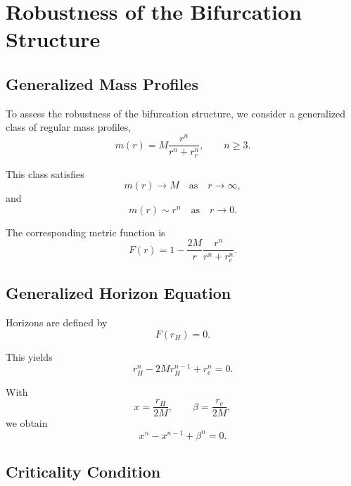 \documentclass[11pt,a4paper]{article}
\begin{document}
\appendix

\section{Robustness of the Bifurcation Structure}

\subsection{Generalized Mass Profiles}

To assess the robustness of the bifurcation structure, we consider a generalized class of regular mass profiles,
\begin{equation}
m(r) =
M
\frac{r^n}{r^n+r_c^n},
\qquad
n \geq 3 .
\end{equation}

This class satisfies
\begin{equation}
m(r) \to M
\quad
\text{as}
\quad
r \to \infty ,
\end{equation}
and
\begin{equation}
m(r) \sim r^n
\quad
\text{as}
\quad
r \to 0 .
\end{equation}

The corresponding metric function is
\begin{equation}
F(r)
=
1 -
\frac{2M}{r}
\frac{r^n}{r^n+r_c^n}.
\end{equation}

\subsection{Generalized Horizon Equation}

Horizons are defined by
\begin{equation}
F(r_H)=0 .
\end{equation}

This yields
\begin{equation}
r_H^n
-
2M r_H^{n-1}
+
r_c^n
=
0 .
\end{equation}

With
\begin{equation}
x = \frac{r_H}{2M},
\qquad
\beta = \frac{r_c}{2M},
\end{equation}
we obtain
\begin{equation}
x^n - x^{n-1} + \beta^n = 0 .
\end{equation}

\subsection{Criticality Condition}
\end{document}
